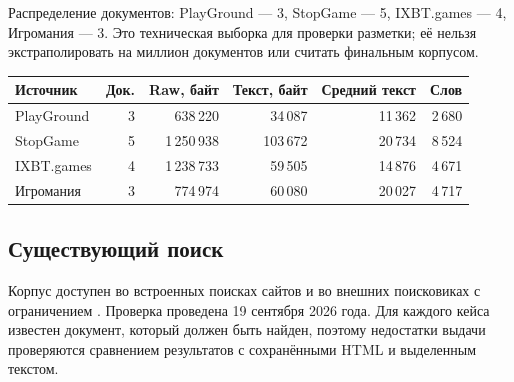 \documentclass[12pt,a4paper]{article}
\newcommand{\code}[1]{\texttt{\detokenize{#1}}}
\begin{document}
Распределение документов: PlayGround --- 3, StopGame --- 5, IXBT.games --- 4,
Игромания --- 3. Это техническая выборка для проверки разметки; её нельзя
экстраполировать на миллион документов или считать финальным корпусом.

\begin{center}
\begin{tabular}{lrrrrr}
\toprule
Источник & Док. & Raw, байт & Текст, байт & Средний текст & Слов \\
\midrule
PlayGround & 3 & 638\,220 & 34\,087 & 11\,362 & 2\,680 \\
StopGame & 5 & 1\,250\,938 & 103\,672 & 20\,734 & 8\,524 \\
IXBT.games & 4 & 1\,238\,733 & 59\,505 & 14\,876 & 4\,671 \\
Игромания & 3 & 774\,974 & 60\,080 & 20\,027 & 4\,717 \\
\bottomrule
\end{tabular}
\end{center}

\subsection{Существующий поиск}

Корпус доступен во встроенных поисках сайтов и во внешних поисковиках с
ограничением \code{site:}. Проверка проведена 19 сентября 2026 года. Для
каждого кейса известен документ, который должен быть найден, поэтому
недостатки выдачи проверяются сравнением результатов с сохранёнными HTML и
выделенным текстом.
\end{document}
